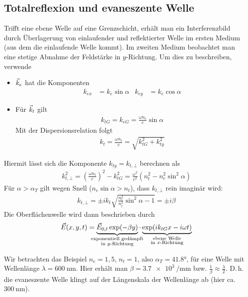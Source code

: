 \subsection{Totalreflexion und evaneszente Welle}
Trifft eine ebene Welle auf eine Grenzschicht,
erhält man ein Interferenzbild durch Überlagerung von einlaufender und
reflektierter Welle im ersten Medium (aus dem die einlaufende Welle kommt).
Im zweiten Medium beobachtet man eine stetige Abnahme der Feldstärke
in $y$-Richtung. Um dies zu beschreiben, verwende
\begin{itemize}
\item $\vec{k}_e$ hat die Komponenten 
  \begin{align*}
    k_{ex} &= k_e\sin\alpha 
    &k_{ey} &= k_e\cos\alpha
  \end{align*}
\item Für $\vec{k}_t$ gilt
  \begin{gather*}
    k_{tG} = k_{eG} = \frac{\omega n_e}{c}\sin\alpha
  \end{gather*}
  Mit der Dispersionsrelation folgt
  \begin{gather*}
    k_t = \frac{\omega n_t}{c} 
    = \sqrt{k_{tG}^2 + k_{ty}^2}
  \end{gather*}
\end{itemize}
Hiermit lässt sich die Komponente $k_{ty}=k_{t,\bot}$ berechnen als
\begin{gather*}
  k_{t,\bot}^2 = \left(\frac{\omega n_t}{c}\right)^2 - k_{tG}^2
  = \frac{\omega^2}{c^2} \left( n_t^2 - n_e^2\sin^2\alpha \right)
\end{gather*}
Für $\alpha>\alpha_T$ gilt wegen Snell ($n_e\sin\alpha > n_t$),
dass $k_{t,\bot}$ rein imaginär wird:
\begin{gather*}
  k_{t,\bot} 
  = \pm ik_{t} \sqrt{\frac{n_e^2}{n_t^2}\sin^2\alpha - 1}
  = \pm i\beta
\end{gather*}
Die Oberflächenwelle wird dann beschrieben durch
\begin{gather*}
  \vecE(x,y,t) = 
  \underbrace{\vecE_{0,t}\exp(-\beta y)}_{\mathclap{\substack{
        \text{exponentiell gedämpft}\\\text{in $y$-Richtung}
      }}
  }
  \cdot 
  \underbrace{\exp(ik_{tG}x - i\omega t)}_{\mathclap{\substack{
        \text{ebene Welle}\\\text{in $x$-Richtung}
      }}
  }
\end{gather*}

Wir betrachten das Beispiel $n_e=1,5$, $n_t=1$, 
also $\alpha_T=\ang{41.8}$, für eine Welle mit Wellenlänge
$\lambda = \SI{600}{\nano\meter}$.
Hier erhält man $\beta = \SI{3.7e3}{\per\milli\meter}$
bzw. $\frac{1}{\beta}\approx\frac{\lambda}{2}$.
D.\,h. die evaneszente Welle klingt auf der Längenskala der Wellenlänge
ab (hier ca. $\SI{300}{\nano\meter}$).

